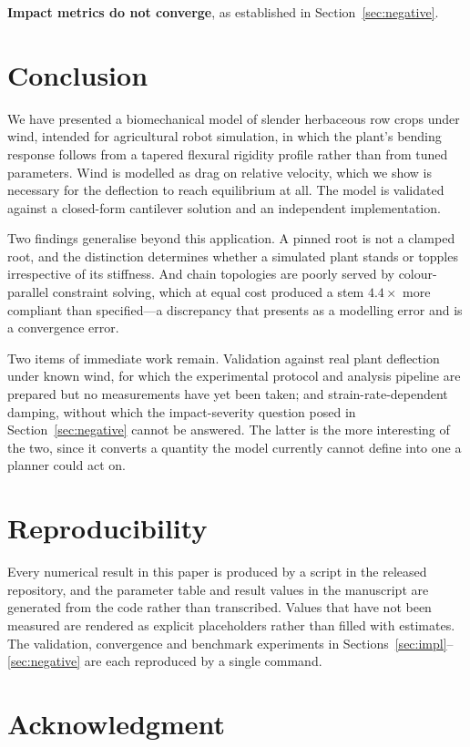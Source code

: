 \documentclass[conference]{IEEEtran}
\begin{document}
\textbf{Impact metrics do not converge}, as established in
Section~\ref{sec:negative}.

\section{Conclusion}

We have presented a biomechanical model of slender herbaceous row crops under
wind, intended for agricultural robot simulation, in which the plant's bending
response follows from a tapered flexural rigidity profile rather than from
tuned parameters. Wind is modelled as drag on relative velocity, which we show
is necessary for the deflection to reach equilibrium at all. The model is
validated against a closed-form cantilever solution and an independent
implementation.

Two findings generalise beyond this application. A pinned root is not a
clamped root, and the distinction determines whether a simulated plant stands
or topples irrespective of its stiffness. And chain topologies are poorly
served by colour-parallel constraint solving, which at equal cost produced a
stem $4.4\times$ more compliant than specified---a discrepancy that presents
as a modelling error and is a convergence error.

Two items of immediate work remain. Validation against real plant deflection
under known wind, for which the experimental protocol and analysis pipeline
are prepared but no measurements have yet been taken; and
strain-rate-dependent damping, without which the impact-severity question
posed in Section~\ref{sec:negative} cannot be answered. The latter is the
more interesting of the two, since it converts a quantity the model currently
cannot define into one a planner could act on.

\section*{Reproducibility}

Every numerical result in this paper is produced by a script in the released
repository, and the parameter table and result values in the manuscript are
generated from the code rather than transcribed. Values that have not been
measured are rendered as explicit placeholders rather than filled with
estimates. The validation, convergence and benchmark experiments in
Sections~\ref{sec:impl}--\ref{sec:negative} are each reproduced by a single
command.

\section*{Acknowledgment}
\end{document}
